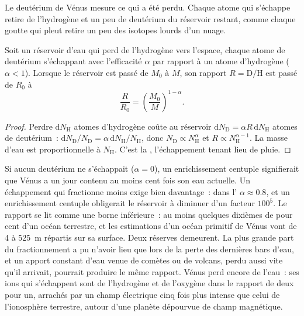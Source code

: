 Le deutérium de Vénus mesure ce qui a été perdu. Chaque atome qui s'échappe
retire de l'hydrogène et un peu de deutérium du réservoir restant, comme chaque
goutte qui pleut retire un peu des isotopes lourds d'un
nuage.

\begin{proposition}\label{prop:b3:planetary-atmospheres:dh}
Soit un réservoir d'eau qui perd de l'hydrogène vers l'espace, chaque atome de deutérium
s'échappant avec l'efficacité $\alpha$ par rapport à un atome d'hydrogène
($\alpha < 1$). Lorsque le réservoir est passé de $M_0$ à $M$, son rapport
$R = \mathrm{D}/\mathrm{H}$ est passé de $R_0$ à
\[
\frac R{R_0} = \left(\frac{M_0}M\right)^{1-\alpha}.
\]
\end{proposition}

\begin{proof}
Perdre $\mathrm dN_\mathrm H$ atomes d'hydrogène coûte au réservoir
$\mathrm dN_\mathrm D = \alpha R\,\mathrm dN_\mathrm H$ atomes de deutérium~:
$\mathrm dN_\mathrm D/N_\mathrm D = \alpha\,\mathrm dN_\mathrm H/
N_\mathrm H$, donc $N_\mathrm D \propto N_\mathrm H^\alpha$ et $R \propto
N_\mathrm H^{\alpha - 1}$. La masse d'eau est proportionnelle à
$N_\mathrm H$. C'est la , l'échappement tenant lieu de
pluie.
\end{proof}

Si aucun deutérium ne s'échappait ($\alpha = 0$), un enrichissement centuple
signifierait que Vénus a un jour contenu au moins cent fois son eau actuelle. Un échappement
qui fractionne moins exige bien davantage~: dans l'
$\alpha \approx 0.8$, et un enrichissement centuple obligerait le réservoir à
diminuer d'un facteur $100^5$. Le rapport se lit comme une borne inférieure~: au moins
quelques dixièmes de pour cent d'un océan terrestre, et les estimations d'un océan
primitif de Vénus vont de 4 à \qty{525}{m} répartis sur sa surface. Deux réserves
demeurent. La plus grande part du fractionnement a pu n'avoir lieu que lors de la perte
des dernières bars d'eau, et un apport constant d'eau venue de comètes ou de volcans,
perdu aussi vite qu'il arrivait, pourrait produire le même rapport. Vénus perd encore de
l'eau~: ses ions qui s'échappent sont de l'hydrogène et de l'oxygène dans le rapport de
deux pour un, arrachés par un champ électrique cinq fois plus intense
que celui de l'ionosphère terrestre, autour d'une
planète dépourvue de champ magnétique.

